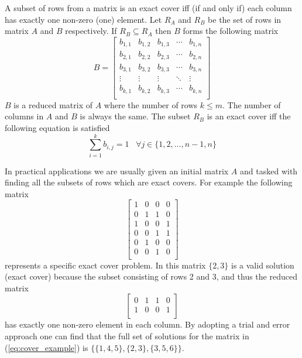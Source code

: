A subset of rows from a matrix is an exact cover iff (if and only if) each column has exactly one non-zero (one) element.
Let $R_A$ and $R_B$ be the set of rows in matrix $A$ and $B$ respectively.
If $R_B \subseteq R_A$ then $B$ forms the following matrix
\[
	B =
	\left[
	\begin{array}{ccccc}
		b_{1,1} & b_{1,2} & b_{1,3} & \cdots & b_{1,n} \\
		b_{2,1} & b_{2,2} & b_{2,3} & \cdots & b_{2,n} \\
		b_{3,1} & b_{3,2} & b_{3,3} & \cdots & b_{3,n} \\
		\vdots  & \vdots  & \vdots  & \ddots & \vdots  \\
		b_{k,1} & b_{k,2} & b_{k,3} & \cdots & b_{k,n} \\
	\end{array}
	\right]
\]
$B$ is a reduced matrix of $A$ where the number of rows $k \leq m$.
The number of columns in $A$ and $B$ is always the same.
The subset $R_B$ is an exact cover iff the following equation is satisfied
\[
	\sum_{i = 1}^{k} b_{i,j} = 1 \;\;\; \forall j \in \{ 1, 2, \ldots, n-1, n \}
\]

In practical applications we are usually given an initial matrix $A$ and tasked with finding all the subsets of rows which are exact covers.
For example the following matrix
\begin{equation}
	\left[
	\begin{array}{cccc}
		1 & 0 & 0 & 0 \\
		0 & 1 & 1 & 0 \\
		1 & 0 & 0 & 1 \\
		0 & 0 & 1 & 1 \\
		0 & 1 & 0 & 0 \\
		0 & 0 & 1 & 0 \\
	\end{array}
	\right]
	\label{eq:cover_example}
\end{equation}
represents a specific exact cover problem.
In this matrix $\{ 2, 3 \}$ is a valid solution (exact cover) because the subset consisting of rows 2 and 3, and thus the reduced matrix
\[
\left[
\begin{array}{cccc}
	0 & 1 & 1 & 0 \\
	1 & 0 & 0 & 1 \\
\end{array}
\right]
\]
has exactly one non-zero element in each column.
By adopting a trial and error approach one can find that the full set of solutions for the matrix in (\ref{eq:cover_example}) is $\{ \{1, 4, 5 \}, \{ 2, 3\}, \{ 3, 5, 6\} \}$.


